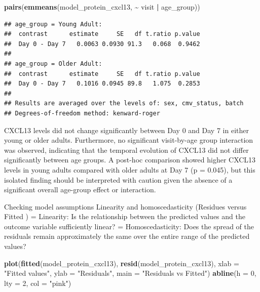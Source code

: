 \documentclass[
]{article}
\newenvironment{Shaded}{\begin{snugshade}}{\end{snugshade}}
\newcommand{\AttributeTok}[1]{\textcolor[rgb]{0.13,0.29,0.53}{#1}}
\newcommand{\DecValTok}[1]{\textcolor[rgb]{0.00,0.00,0.81}{#1}}
\newcommand{\FunctionTok}[1]{\textcolor[rgb]{0.13,0.29,0.53}{\textbf{#1}}}
\newcommand{\NormalTok}[1]{#1}
\newcommand{\SpecialCharTok}[1]{\textcolor[rgb]{0.81,0.36,0.00}{\textbf{#1}}}
\newcommand{\StringTok}[1]{\textcolor[rgb]{0.31,0.60,0.02}{#1}}
\begin{document}
\begin{Shaded}
\begin{Highlighting}[]
\FunctionTok{pairs}\NormalTok{(}\FunctionTok{emmeans}\NormalTok{(model\_protein\_cxcl13,}
              \SpecialCharTok{\textasciitilde{}}\NormalTok{ visit }\SpecialCharTok{|}\NormalTok{ age\_group))}
\end{Highlighting}
\end{Shaded}

\begin{verbatim}
## age_group = Young Adult:
##  contrast      estimate     SE   df t.ratio p.value
##  Day 0 - Day 7   0.0063 0.0930 91.3   0.068  0.9462
## 
## age_group = Older Adult:
##  contrast      estimate     SE   df t.ratio p.value
##  Day 0 - Day 7   0.1016 0.0945 89.8   1.075  0.2853
## 
## Results are averaged over the levels of: sex, cmv_status, batch 
## Degrees-of-freedom method: kenward-roger
\end{verbatim}

CXCL13 levels did not change significantly between Day 0 and Day 7 in
either young or older adults. Furthermore, no significant visit-by-age
group interaction was observed, indicating that the temporal evolution
of CXCL13 did not differ significantly between age groups. A post-hoc
comparison showed higher CXCL13 levels in young adults compared with
older adults at Day 7 (p = 0.045), but this isolated finding should be
interpreted with caution given the absence of a significant overall
age-group effect or interaction.

Checking model assumptions Linearity and homoscedasticity (Residues
versus Fitted ) = Linearity: Is the relationship between the predicted
values \hspace{0pt}\hspace{0pt}and the outcome variable sufficiently
linear? = Homoscedasticity: Does the spread of the residuals remain
approximately the same over the entire range of the predicted values?

\begin{Shaded}
\begin{Highlighting}[]
\FunctionTok{plot}\NormalTok{(}\FunctionTok{fitted}\NormalTok{(model\_protein\_cxcl13), }\FunctionTok{resid}\NormalTok{(model\_protein\_cxcl13),}
     \AttributeTok{xlab =} \StringTok{"Fitted values"}\NormalTok{, }\AttributeTok{ylab =} \StringTok{"Residuals"}\NormalTok{,}
     \AttributeTok{main =} \StringTok{"Residuals vs Fitted"}\NormalTok{)}
\FunctionTok{abline}\NormalTok{(}\AttributeTok{h =} \DecValTok{0}\NormalTok{, }\AttributeTok{lty =} \DecValTok{2}\NormalTok{, }\AttributeTok{col =} \StringTok{"pink"}\NormalTok{)}
\end{Highlighting}
\end{Shaded}
\end{document}
